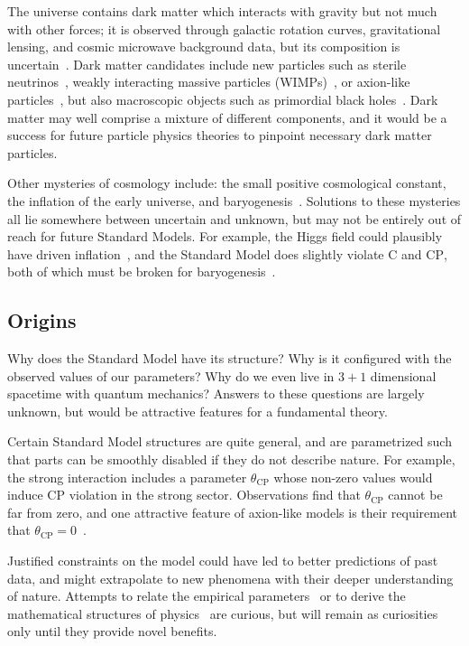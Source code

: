 The universe contains dark matter which interacts with gravity but not much
with other forces; it is observed through galactic rotation curves,
gravitational lensing, and cosmic microwave background data,
but its composition is uncertain~\cite{
begeman1991rotation,
garrett2010dark,
planck2020results
}.
Dark matter candidates include new particles such as
sterile neutrinos~\cite{boyarsky2019sterile},
weakly interacting massive particles (WIMPs)~\cite{jungman1996wimp},
or
axion-like particles~\cite{kim2008axions},
but also macroscopic objects such as
primordial black holes~\cite{bernard2019primordial}.
Dark matter may well comprise a mixture of different components, and it would
be a success for future particle physics theories to pinpoint necessary dark
matter particles.

Other mysteries of cosmology include:
the small positive cosmological constant,
the inflation of the early universe,
and baryogenesis~\cite{
wells2020discovery,
riess1998observational
}.
Solutions to these mysteries all lie somewhere between uncertain and unknown,
but may not be entirely out of reach for future Standard Models.
For example, the Higgs field could plausibly have driven
inflation~\cite{bezrukov2008higgs},
and the Standard Model does slightly violate $\mathrm{C}$ and $\mathrm{CP}$,
both of which must be broken for baryogenesis~\cite{sakharov1991re}.


\subsection{Origins}
Why does the Standard Model have its structure?
Why is it configured with the observed values of our parameters?
Why do we even live in $3+1$ dimensional spacetime with quantum mechanics?
Answers to these questions are largely unknown, but would be
attractive features for a fundamental theory.

Certain Standard Model structures are quite general, and are parametrized such
that parts can be smoothly disabled if they do not describe nature.
For example, the strong interaction includes a parameter $\theta_\mathrm{CP}$
whose non-zero values would induce $\mathrm{CP}$ violation in the strong
sector.
Observations find that $\theta_\mathrm{CP}$ cannot be far from zero, and one
attractive feature of axion-like models is their requirement that
$\theta_\mathrm{CP} = 0$~\cite{
kim2008axions,
thomson2013modern,
martin2017particle
}.

Justified constraints on the model could have led to better predictions of
past data, and might extrapolate to new phenomena with their deeper
understanding of nature.
Attempts to relate the empirical parameters~\cite{
sato1979ratio,
beg1982gauge,
koide1983fermion,
denterria2012gaussian
}
or to derive the mathematical structures of physics~\cite{
goyal2010origin,
skilling2021abc,
axioms1010038
}
are curious, but will remain as curiosities only until they provide novel
benefits.


